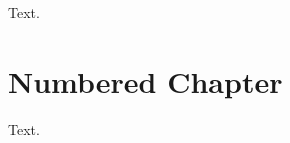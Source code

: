 \documentclass[a4paper,12pt]{report}
\begin{document}
\tableofcontents
\clearpage
{}
Text.
\chapter{Numbered Chapter}
Text.
\end{document}
